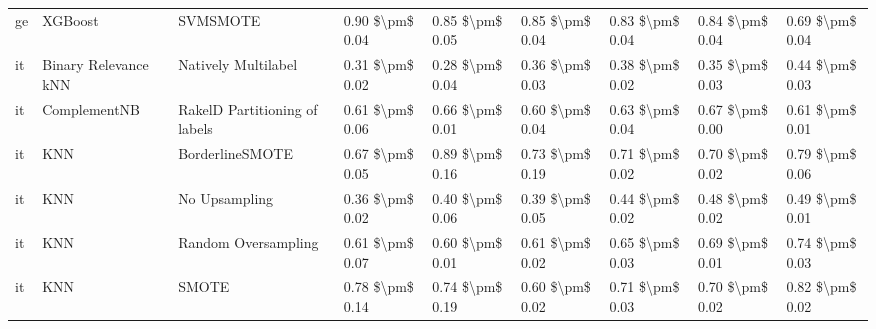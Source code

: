 \begin{tabular}{lllllllll}
      ge &                         XGBoost &                      SVMSMOTE &     0.90 \$\textbackslash pm\$ 0.04 &           0.85 \$\textbackslash pm\$ 0.05 &       0.85 \$\textbackslash pm\$ 0.04 &        0.83 \$\textbackslash pm\$ 0.04 &                         0.84 \$\textbackslash pm\$ 0.04 &     0.69 \$\textbackslash pm\$ 0.04 \\
      it &            Binary Relevance kNN &           Natively Multilabel &     0.31 \$\textbackslash pm\$ 0.02 &           0.28 \$\textbackslash pm\$ 0.04 &       0.36 \$\textbackslash pm\$ 0.03 &        0.38 \$\textbackslash pm\$ 0.02 &                         0.35 \$\textbackslash pm\$ 0.03 &     0.44 \$\textbackslash pm\$ 0.03 \\
      it &                    ComplementNB & RakelD Partitioning of labels &     0.61 \$\textbackslash pm\$ 0.06 &           0.66 \$\textbackslash pm\$ 0.01 &       0.60 \$\textbackslash pm\$ 0.04 &        0.63 \$\textbackslash pm\$ 0.04 &                         0.67 \$\textbackslash pm\$ 0.00 &     0.61 \$\textbackslash pm\$ 0.01 \\
      it &                             KNN &               BorderlineSMOTE &     0.67 \$\textbackslash pm\$ 0.05 &           0.89 \$\textbackslash pm\$ 0.16 &       0.73 \$\textbackslash pm\$ 0.19 &        0.71 \$\textbackslash pm\$ 0.02 &                         0.70 \$\textbackslash pm\$ 0.02 &     0.79 \$\textbackslash pm\$ 0.06 \\
      it &                             KNN &                 No Upsampling &     0.36 \$\textbackslash pm\$ 0.02 &           0.40 \$\textbackslash pm\$ 0.06 &       0.39 \$\textbackslash pm\$ 0.05 &        0.44 \$\textbackslash pm\$ 0.02 &                         0.48 \$\textbackslash pm\$ 0.02 &     0.49 \$\textbackslash pm\$ 0.01 \\
      it &                             KNN &           Random Oversampling &     0.61 \$\textbackslash pm\$ 0.07 &           0.60 \$\textbackslash pm\$ 0.01 &       0.61 \$\textbackslash pm\$ 0.02 &        0.65 \$\textbackslash pm\$ 0.03 &                         0.69 \$\textbackslash pm\$ 0.01 &     0.74 \$\textbackslash pm\$ 0.03 \\
      it &                             KNN &                         SMOTE &     0.78 \$\textbackslash pm\$ 0.14 &           0.74 \$\textbackslash pm\$ 0.19 &       0.60 \$\textbackslash pm\$ 0.02 &        0.71 \$\textbackslash pm\$ 0.03 &                         0.70 \$\textbackslash pm\$ 0.02 &     0.82 \$\textbackslash pm\$ 0.02 \\

\end{tabular}
